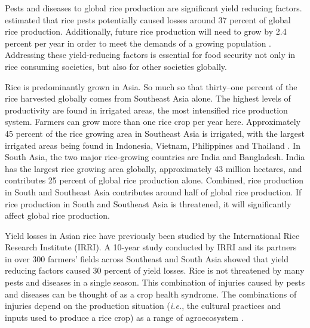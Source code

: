 
Pests and diseases to global rice production are significant yield reducing factors.  estimated that rice pests potentially caused losses around 37 percent of global rice production. Additionally, future rice production will need to grow by 2.4 percent per year in order to meet the demands of a growing population . Addressing these yield-reducing factors is essential for food security not only in rice consuming societies, but also for other societies globally.


Rice is predominantly grown in Asia. So much so that thirty--one percent of the rice harvested globally comes from Southeast Asia  alone. The highest levels of productivity are found in irrigated areas, the most intensified rice production system. Farmers can grow more than one rice crop per year here. Approximately 45 percent of the rice growing area in Southeast Asia is irrigated, with the largest irrigated areas being found in Indonesia, Vietnam, Philippines and Thailand . In South Asia, the two major rice-growing countries are India and Bangladesh. India has the largest rice growing area globally, approximately 43 million hectares, and contributes 25 percent of global rice production alone. Combined, rice production in South and Southeast Asia contributes around half of global rice production. If rice production in South and Southeast Asia is threatened, it will significantly affect global rice production. 

Yield losses in Asian rice have previously been studied by the International Rice Research Institute (IRRI). A 10-year study conducted by IRRI and its partners  in over 300 farmers' fields across Southeast and South Asia showed that yield reducing factors caused 30 percent of yield losses. Rice is not threatened by many pests and diseases in a single season. This combination of injuries caused by pests and diseases can be thought of as a crop health syndrome. The combinations of injuries depend on the production situation (\textit{i.e.}, the cultural practices and inputs used to produce a rice crop) as a range of agroecosystem .

